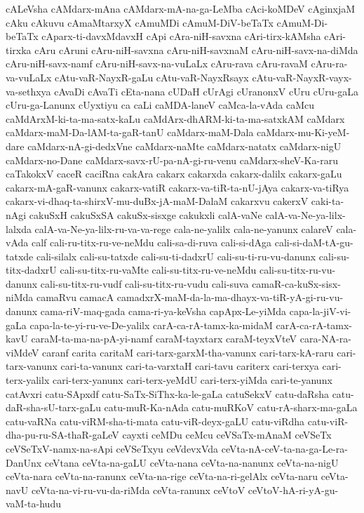 {cALeVsha
cAMdarx-mAna
cAMdarx-mA-na-ga-LeMba
cAci-koMDeV
cAginxjaM
cAku
cAkuvu
cAmaMtarxyX
cAmuMDi
cAmuM-DiV-beTaTx
cAmuM-Di-beTaTx
cAparx-ti-davxMdavxH
cApi
cAra-niH-savxna
cAri-tirx-kAMsha
cAri-tirxka
cAru
cAruni
cAru-niH-savxna
cAru-niH-savxnaM
cAru-niH-savx-na-diMda
cAru-niH-savx-namf
cAru-niH-savx-na-vuLaLx
cAru-rava
cAru-ravaM
cAru-ra-va-vuLaLx
cAtu-vaR-NayxR-gaLu
cAtu-vaR-NayxRsayx
cAtu-vaR-NayxR-vayx-va-sethxya
cAvaDi
cAvaTi
cEta-nana
cUDaH
cUrAgi
cUranonxV
cUru
cUru-gaLa
cUru-ga-Lanunx
cUyxtiyu
ca
caLi
caMDA-laneV
caMca-la-vAda
caMcu
caMdArxM-ki-ta-ma-satx-kaLu
caMdArx-dhARM-ki-ta-ma-satxkAM
caMdarx
caMdarx-maM-Da-lAM-ta-gaR-tanU
caMdarx-maM-Dala
caMdarx-mu-Ki-yeM-dare
caMdarx-nA-gi-dedxVne
caMdarx-naMte
caMdarx-natatx
caMdarx-nigU
caMdarx-no-Dane
caMdarx-savx-rU-pa-nA-gi-ru-venu
caMdarx-sheV-Ka-raru
caTakokxV
caceR
caciRna
cakAra
cakarx
cakarxda
cakarx-dalilx
cakarx-gaLu
cakarx-mA-gaR-vanunx
cakarx-vatiR
cakarx-va-tiR-ta-nU-jAya
cakarx-va-tiRya
cakarx-vi-dhaq-ta-shirxV-mu-duBx-jA-maM-DalaM
cakarxvu
cakerxV
caki-ta-nAgi
cakuSxH
cakuSxSA
cakuSx-sisxge
cakukxli
calA-vaNe
calA-va-Ne-ya-lilx-lalxda
calA-va-Ne-ya-lilx-ru-va-va-rege
cala-ne-yalilx
cala-ne-yanunx
calareV
cala-vAda
calf
cali-ru-titx-ru-ve-neMdu
cali-sa-di-ruva
cali-si-dAga
cali-si-daM-tA-gu-tatxde
cali-silalx
cali-su-tatxde
cali-su-ti-dadxrU
cali-su-ti-ru-vu-danunx
cali-su-titx-dadxrU
cali-su-titx-ru-vaMte
cali-su-titx-ru-ve-neMdu
cali-su-titx-ru-vu-danunx
cali-su-titx-ru-vudf
cali-su-titx-ru-vudu
cali-suva
camaR-ca-kuSx-sisx-niMda
camaRvu
camacA
camadxrX-maM-da-la-ma-dhayx-va-tiR-yA-gi-ru-vu-danunx
cama-riV-maq-gada
cama-ri-ya-keVsha
capApx-Le-yiMda
capa-la-jiV-vi-gaLa
capa-la-te-yi-ru-ve-De-yalilx
carA-ca-rA-tamx-ka-midaM
carA-ca-rA-tamx-kavU
caraM-ta-ma-na-pA-yi-namf
caraM-tayxtarx
caraM-teyxVteV
cara-NA-ra-viMdeV
caranf
carita
caritaM
cari-tarx-garxM-tha-vanunx
cari-tarx-kA-raru
cari-tarx-vanunx
cari-ta-vanunx
cari-ta-varxtaH
cari-tavu
cariterx
cari-terxya
cari-terx-yalilx
cari-terx-yanunx
cari-terx-yeMdU
cari-terx-yiMda
cari-te-yanunx
catAvxri
catu-SApxdf
catu-SaTx-SiThx-ka-le-gaLa
catuSekxV
catu-daRsha
catu-daR-sha-sU-tarx-gaLu
catu-muR-Ka-nAda
catu-muRKoV
catu-rA-sharx-ma-gaLa
catu-vaRNa
catu-viRM-sha-ti-mata
catu-viR-deyx-gaLU
catu-viRdha
catu-viR-dha-pu-ru-SA-thaR-gaLeV
cayxti
ceMDu
ceMcu
ceVSaTx-mAnaM
ceVSeTx
ceVSeTxV-namx-na-sApi
ceVSeTxyu
ceVdevxVda
ceVta-nA-ceV-ta-na-ga-Le-ra-DanUnx
ceVtana
ceVta-na-gaLU
ceVta-nana
ceVta-na-nanunx
ceVta-na-nigU
ceVta-nara
ceVta-na-ranunx
ceVta-na-rige
ceVta-na-ri-gelAlx
ceVta-naru
ceVta-navU
ceVta-na-vi-ru-vu-da-riMda
ceVta-ranunx
ceVtoV
ceVtoV-hA-ri-yA-gu-vaM-ta-hudu
}
